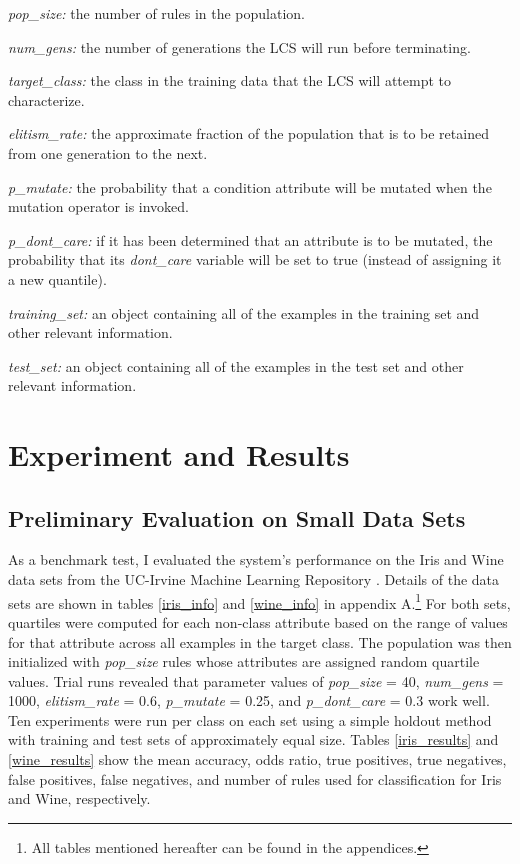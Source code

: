 \documentclass[12pt,twoside]{article}
\begin{document}
\begin{description}
\item \textit{pop\_size:} the number of rules in the population.
\item \textit{num\_gens:} the number of generations the LCS will run before terminating.
\item \textit{target\_class:} the class in the training data that the LCS will attempt to characterize.
\item \textit{elitism\_rate:} the approximate fraction of the population that is to be retained from one generation to the next.
\item \textit{p\_mutate:} the probability that a condition attribute will be mutated when the mutation operator is invoked.
\item \textit{p\_dont\_care:} if it has been determined that an attribute is to be mutated, the probability that its \textit{dont\_care} variable will be set to true (instead of assigning it a new quantile).
\item \textit{training\_set:} an object containing all of the examples in the training set and other relevant information.
\item \textit{test\_set:} an object containing all of the examples in the test set and other relevant information.
\end{description}

\section{Experiment and Results}

\subsection{Preliminary Evaluation on Small Data Sets}

As a benchmark test, I evaluated the system's performance on the Iris and Wine data sets from the UC-Irvine Machine Learning Repository \cite{noauthor_uci_nodate-1,noauthor_uci_nodate}. Details of the data sets are shown in tables \ref{iris_info} and \ref{wine_info} in appendix A.\footnote{All tables mentioned hereafter can be found in the appendices.} For both sets, quartiles were computed for each non-class attribute based on the range of values for that attribute across all examples in the target class. The population was then initialized with \textit{pop\_size} rules whose attributes are assigned random quartile values. Trial runs revealed that parameter values of \textit{pop\_size} = 40, \textit{num\_gens} = 1000, \textit{elitism\_rate} = 0.6, \textit{p\_mutate} = 0.25, and \textit{p\_dont\_care} = 0.3 work well. Ten experiments were run per class on each set using a simple holdout method with training and test sets of approximately equal size. Tables \ref{iris_results} and \ref{wine_results} show the mean accuracy, odds ratio, true positives, true negatives, false positives, false negatives, and number of rules used for classification for Iris and Wine, respectively. 
\end{document}
